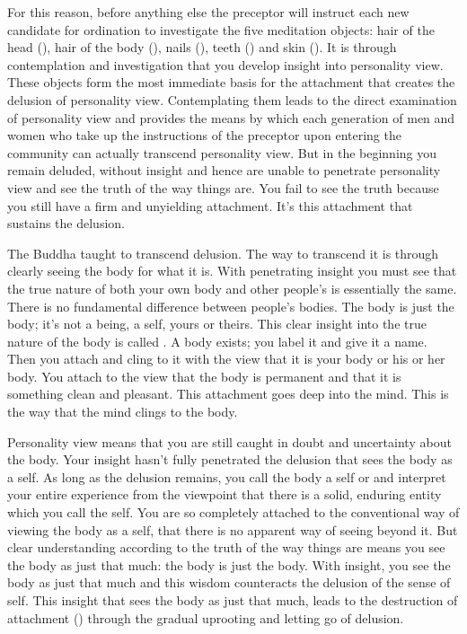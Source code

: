 For this reason, before anything else the preceptor will instruct each new candidate for  ordination to investigate the five meditation objects: hair of the head (), hair of the body (), nails (), teeth () and skin (). It is through contemplation and investigation that you develop insight into personality view. These objects form the most immediate basis for the attachment that creates the delusion of personality view. Contemplating them leads to the direct examination of personality view and provides the means by which each generation of men and women who take up the instructions of the preceptor upon entering the community can actually transcend personality view. But in the beginning you remain deluded, without insight and hence are unable to penetrate personality view and see the truth of the way things are. You fail to see the truth because you still have a firm and unyielding attachment. It's this attachment that sustains the delusion.

The Buddha taught to transcend delusion. The way to transcend it is through clearly seeing the body for what it is. With penetrating insight you must see that the true nature of both your own body and other people's is essentially the same. There is no fundamental difference between people's bodies. The body is just the body; it's not a being, a self, yours or theirs. This clear insight into the true nature of the body is called . A body exists; you label it and give it a name. Then you attach and cling to it with the view that it is your body or his or her body. You attach to the view that the body is permanent and that it is something clean and pleasant. This attachment goes deep into the mind. This is the way that the mind clings to the body.

Personality view means that you are still caught in doubt and uncertainty about the body. Your insight hasn't fully penetrated the delusion that sees the body as a self. As long as the delusion remains, you call the body a self or  and interpret your entire experience from the viewpoint that there is a solid, enduring entity which you call the self. You are so completely attached to the conventional way of viewing the body as a self, that there is no apparent way of seeing beyond it. But clear understanding according to the truth of the way things are means you see the body as just that much: the body is just the body. With insight, you see the body as just that much and this wisdom counteracts the delusion of the sense of self. This insight that sees the body as just that much, leads to the destruction of attachment () through the gradual uprooting and letting go of delusion.


